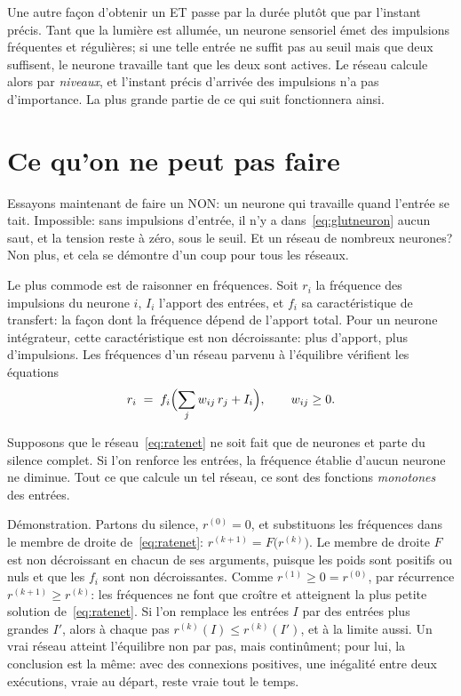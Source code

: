 Une autre façon d'obtenir un ET passe par la durée plutôt que par l'instant précis. Tant que la lumière est allumée, un neurone sensoriel émet des impulsions fréquentes et régulières; si une telle entrée ne suffit pas au seuil mais que deux suffisent, le neurone travaille tant que les deux sont actives. Le réseau calcule alors par \emph{niveaux}, et l'instant précis d'arrivée des impulsions n'a pas d'importance. La plus grande partie de ce qui suit fonctionnera ainsi.

\section{Ce qu'on ne peut pas faire}

Essayons maintenant de faire un NON: un neurone qui travaille quand l'entrée se tait. Impossible: sans impulsions d'entrée, il n'y a dans~\eqref{eq:glutneuron} aucun saut, et la tension reste à zéro, sous le seuil. Et un réseau de nombreux neurones? Non plus, et cela se démontre d'un coup pour tous les réseaux.

Le plus commode est de raisonner en fréquences. Soit $r_i$ la fréquence des impulsions du neurone $i$, $I_i$ l'apport des entrées, et $f_i$ sa caractéristique de transfert: la façon dont la fréquence dépend de l'apport total. Pour un neurone intégrateur, cette caractéristique est non décroissante: plus d'apport, plus d'impulsions. Les fréquences d'un réseau parvenu à l'équilibre vérifient les équations
\begin{equation}
r_i \;=\; f_i\Bigl(\sum_j w_{ij}\,r_j + I_i\Bigr), \qquad w_{ij}\ge 0 .
\label{eq:ratenet}
\end{equation}

\begin{keyblock}
\begin{proposition}[Monotonie]
\label{prop:monotone}
Supposons que le réseau~\eqref{eq:ratenet} ne soit fait que de neurones  et parte du silence complet. Si l'on renforce les entrées, la fréquence établie d'aucun neurone ne diminue. Tout ce que calcule un tel réseau, ce sont des fonctions \emph{monotones} des entrées.
\end{proposition}
\end{keyblock}

Démonstration. Partons du silence, $r^{(0)}=0$, et substituons les fréquences dans le membre de droite de~\eqref{eq:ratenet}: $r^{(k+1)}=F\bigl(r^{(k)}\bigr)$. Le membre de droite $F$ est non décroissant en chacun de ses arguments, puisque les poids sont positifs ou nuls et que les $f_i$ sont non décroissantes. Comme $r^{(1)}\ge0=r^{(0)}$, par récurrence $r^{(k+1)}\ge r^{(k)}$: les fréquences ne font que croître et atteignent la plus petite solution de~\eqref{eq:ratenet}. Si l'on remplace les entrées $I$ par des entrées plus grandes $I'$, alors à chaque pas $r^{(k)}(I)\le r^{(k)}(I')$, et à la limite aussi. Un vrai réseau atteint l'équilibre non par pas, mais continûment; pour lui, la conclusion est la même: avec des connexions positives, une inégalité entre deux exécutions, vraie au départ, reste vraie tout le temps.

